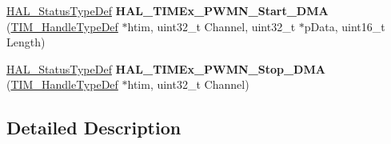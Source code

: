 \begin{DoxyCompactItemize}
\item 
\hyperlink{stm32f4xx__hal__def_8h_a63c0679d1cb8b8c684fbb0632743478f}{H\+A\+L\+\_\+\+Status\+Type\+Def} {\bfseries H\+A\+L\+\_\+\+T\+I\+M\+Ex\+\_\+\+P\+W\+M\+N\+\_\+\+Start\+\_\+\+D\+MA} (\hyperlink{struct_t_i_m___handle_type_def}{T\+I\+M\+\_\+\+Handle\+Type\+Def} $\ast$htim, uint32\+\_\+t Channel, uint32\+\_\+t $\ast$p\+Data, uint16\+\_\+t Length)\hypertarget{group___t_i_m_ex___exported___functions___group3_gac525533dc108ee4915ca93d5a43cb3b5}{}\label{group___t_i_m_ex___exported___functions___group3_gac525533dc108ee4915ca93d5a43cb3b5}

\item 
\hyperlink{stm32f4xx__hal__def_8h_a63c0679d1cb8b8c684fbb0632743478f}{H\+A\+L\+\_\+\+Status\+Type\+Def} {\bfseries H\+A\+L\+\_\+\+T\+I\+M\+Ex\+\_\+\+P\+W\+M\+N\+\_\+\+Stop\+\_\+\+D\+MA} (\hyperlink{struct_t_i_m___handle_type_def}{T\+I\+M\+\_\+\+Handle\+Type\+Def} $\ast$htim, uint32\+\_\+t Channel)\hypertarget{group___t_i_m_ex___exported___functions___group3_ga10afdfdc5eed2e0288ccb969f48bc0e4}{}\label{group___t_i_m_ex___exported___functions___group3_ga10afdfdc5eed2e0288ccb969f48bc0e4}

\end{DoxyCompactItemize}


\subsection{Detailed Description}
